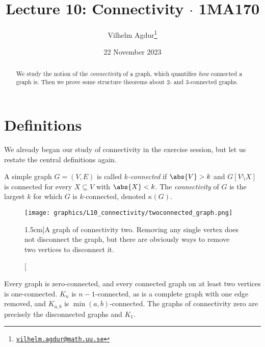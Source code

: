 \documentclass[nobib]{tufte-handout}
\title{Lecture 10: Connectivity $\cdot$ 1MA170}
\author[Vilhelm Agdur]{Vilhelm Agdur\thanks{\href{mailto:vilhelm.agdur@math.uu.se}{\nolinkurl{vilhelm.agdur@math.uu.se}}}}
\date{22 November 2023}
\begin{document}
\maketitle%

\begin{abstract}
\noindent
We study the notion of the \emph{connectivity} of a graph, which quantifies \emph{how} connected a graph is. Then we prove some structure theorems about $2$- and $3$-connected graphs.
\end{abstract}

\section{Definitions}

We already began our study of connectivity in the exercise session, but let us restate the central definitions again.

\begin{definition}
  A simple graph $G = (V,E)$ is called \emph{$k$-connected} if $\abs{V} > k$ and $G[V\setminus X]$ is connected for every $X \subseteq V$ with $\abs{X} < k$. The \emph{connectivity} of $G$ is the largest $k$ for which $G$ is $k$-connected, denoted $\kappa(G)$. 
\end{definition}

\begin{figure}
  \centering
  \texttt{[image: graphics/L10\_connectivity/twoconnected\_graph.png]}
  \caption[][1.5cm]{A graph of connectivity two. Removing any single vertex does not disconnect the graph, but there are obviously ways to remove two vertices to disconnect it.}
  \label{fig:twoconnected_graph}
\end{figure}

\begin{example}
  Every graph is zero-connected, and every connected graph on at least two vertices is one-connected. $K_n$ is $n-1$-connected, as is a complete graph with one edge removed, and $K_{a,b}$ is $\min(a,b)$-connected. The graphs of connectivity zero are precisely the disconnected graphs and $K_1$.
\end{example}
\end{document}
